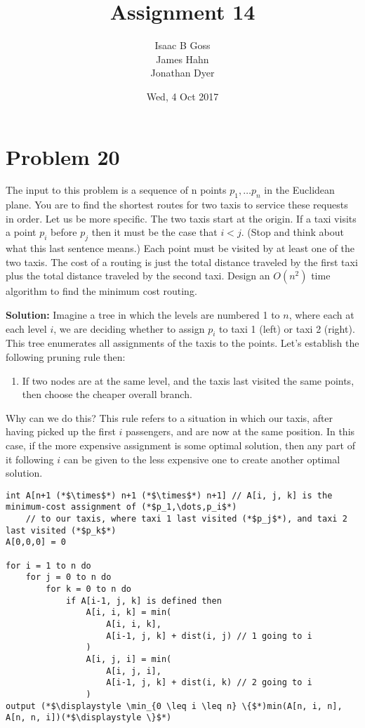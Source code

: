 \documentclass{article}
\author{Isaac B Goss\\ James Hahn\\ Jonathan Dyer}
\title{Assignment 14}
\date{Wed, 4 Oct 2017}
\providecommand{\prob}[1]{\section*{Problem #1}}
\providecommand{\soln}{\textbf{Solution: }}
\begin{document}
\maketitle
\prob{20}
The input to this problem is a sequence of n points $p_1, \dots p_n$ in the Euclidean plane. You are to find the shortest routes for two taxis to service these requests in order. Let us be more specific. The two taxis start at the origin. If a taxi visits a point $p_i$ before $p_j$ then it must be the case that $i < j$. (Stop and think about what this last sentence means.) Each point must be visited by at least one of the two taxis. The cost of a routing is just the total distance traveled by the first taxi plus the total distance traveled by the second taxi. Design an $O\left(n^2\right)$ time algorithm to find the minimum cost routing.

\soln Imagine a tree in which the levels are numbered 1 to $n$, where each at each level $i$, we are deciding whether to assign $p_i$ to taxi 1 (left) or taxi 2 (right).
This tree enumerates all assignments of the taxis to the points.
Let's establish the following pruning rule then:
\begin{enumerate}
    \item If two nodes are at the same level, and the taxis last visited the same points, then choose the cheaper overall branch.
\end{enumerate}

Why can we do this? This rule refers to a situation in which our taxis, after having picked up the first $i$ passengers, and are now at the same position.
In this case, if the more expensive assignment is some optimal solution, then any part of it following $i$ can be given to the less expensive one to create another optimal solution.

\begin{lstlisting}
int A[n+1 (*$\times$*) n+1 (*$\times$*) n+1] // A[i, j, k] is the minimum-cost assignment of (*$p_1,\dots,p_i$*)
    // to our taxis, where taxi 1 last visited (*$p_j$*), and taxi 2 last visited (*$p_k$*)
A[0,0,0] = 0

for i = 1 to n do
    for j = 0 to n do
        for k = 0 to n do
            if A[i-1, j, k] is defined then
                A[i, i, k] = min(
                    A[i, i, k],
                    A[i-1, j, k] + dist(i, j) // 1 going to i
                )
                A[i, j, i] = min(
                    A[i, j, i],
                    A[i-1, j, k] + dist(i, k) // 2 going to i
                )
output (*$\displaystyle \min_{0 \leq i \leq n} \{$*)min(A[n, i, n], A[n, n, i])(*$\displaystyle \}$*)
\end{lstlisting}
\end{document}
